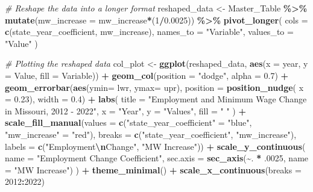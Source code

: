 \documentclass[
]{article}
\newenvironment{Shaded}{\begin{snugshade}}{\end{snugshade}}
\newcommand{\AttributeTok}[1]{\textcolor[rgb]{0.13,0.29,0.53}{#1}}
\newcommand{\CommentTok}[1]{\textcolor[rgb]{0.56,0.35,0.01}{\textit{#1}}}
\newcommand{\DecValTok}[1]{\textcolor[rgb]{0.00,0.00,0.81}{#1}}
\newcommand{\FloatTok}[1]{\textcolor[rgb]{0.00,0.00,0.81}{#1}}
\newcommand{\FunctionTok}[1]{\textcolor[rgb]{0.13,0.29,0.53}{\textbf{#1}}}
\newcommand{\NormalTok}[1]{#1}
\newcommand{\OtherTok}[1]{\textcolor[rgb]{0.56,0.35,0.01}{#1}}
\newcommand{\SpecialCharTok}[1]{\textcolor[rgb]{0.81,0.36,0.00}{\textbf{#1}}}
\newcommand{\StringTok}[1]{\textcolor[rgb]{0.31,0.60,0.02}{#1}}
\begin{document}
\begin{Shaded}
\begin{Highlighting}[]
\CommentTok{\# Reshape the data into a longer format}
\NormalTok{reshaped\_data }\OtherTok{\textless{}{-}}\NormalTok{ Master\_Table }\SpecialCharTok{\%\textgreater{}\%}
  \FunctionTok{mutate}\NormalTok{(}\AttributeTok{mw\_increase =}\NormalTok{ mw\_increase}\SpecialCharTok{*}\NormalTok{(}\DecValTok{1}\SpecialCharTok{/}\FloatTok{0.0025}\NormalTok{)) }\SpecialCharTok{\%\textgreater{}\%}
  \FunctionTok{pivot\_longer}\NormalTok{(}
    \AttributeTok{cols =} \FunctionTok{c}\NormalTok{(state\_year\_coefficient, mw\_increase),}
    \AttributeTok{names\_to =} \StringTok{"Variable"}\NormalTok{,}
    \AttributeTok{values\_to =} \StringTok{"Value"}
\NormalTok{  )}

\CommentTok{\# Plotting the reshaped data}
\NormalTok{col\_plot }\OtherTok{\textless{}{-}} \FunctionTok{ggplot}\NormalTok{(reshaped\_data, }\FunctionTok{aes}\NormalTok{(}\AttributeTok{x =}\NormalTok{ year, }\AttributeTok{y =}\NormalTok{ Value, }\AttributeTok{fill =}\NormalTok{ Variable)) }\SpecialCharTok{+}
  \FunctionTok{geom\_col}\NormalTok{(}\AttributeTok{position =} \StringTok{"dodge"}\NormalTok{, }\AttributeTok{alpha =} \FloatTok{0.7}\NormalTok{) }\SpecialCharTok{+}
  \FunctionTok{geom\_errorbar}\NormalTok{(}\FunctionTok{aes}\NormalTok{(}\AttributeTok{ymin=}\NormalTok{ lwr, }\AttributeTok{ymax=}\NormalTok{ upr), }
                \AttributeTok{position =} \FunctionTok{position\_nudge}\NormalTok{( }\AttributeTok{x =} \FloatTok{0.23}\NormalTok{), }\AttributeTok{width =} \FloatTok{0.4}\NormalTok{) }\SpecialCharTok{+}
  \FunctionTok{labs}\NormalTok{(}
    \AttributeTok{title =} \StringTok{"Employment and Minimum Wage Change in Missouri, 2012 {-} 2022"}\NormalTok{,}
    \AttributeTok{x =} \StringTok{"Year"}\NormalTok{,}
    \AttributeTok{y =} \StringTok{"Values"}\NormalTok{,}
    \AttributeTok{fill =} \StringTok{" "}
\NormalTok{  ) }\SpecialCharTok{+} 
  \FunctionTok{scale\_fill\_manual}\NormalTok{(}\AttributeTok{values =} \FunctionTok{c}\NormalTok{(}\StringTok{"state\_year\_coefficient"} \OtherTok{=} \StringTok{"blue"}\NormalTok{, }\StringTok{"mw\_increase"} \OtherTok{=} \StringTok{"red"}\NormalTok{), }
                    \AttributeTok{breaks =} \FunctionTok{c}\NormalTok{(}\StringTok{"state\_year\_coefficient"}\NormalTok{, }\StringTok{"mw\_increase"}\NormalTok{),}
                    \AttributeTok{labels =} \FunctionTok{c}\NormalTok{(}\StringTok{"Employment}\SpecialCharTok{\textbackslash{}n}\StringTok{Change"}\NormalTok{, }\StringTok{"MW Increase"}\NormalTok{)) }\SpecialCharTok{+}
  \FunctionTok{scale\_y\_continuous}\NormalTok{(}
    \AttributeTok{name =} \StringTok{"Employment Change Coefficient"}\NormalTok{,}
    \AttributeTok{sec.axis =} \FunctionTok{sec\_axis}\NormalTok{(}\SpecialCharTok{\textasciitilde{}}\NormalTok{. }\SpecialCharTok{*}\NormalTok{ .}\DecValTok{0025}\NormalTok{, }\AttributeTok{name =} \StringTok{"MW Increase"}\NormalTok{)}
\NormalTok{  ) }\SpecialCharTok{+} 
  \FunctionTok{theme\_minimal}\NormalTok{() }\SpecialCharTok{+} 
  \FunctionTok{scale\_x\_continuous}\NormalTok{(}\AttributeTok{breaks =} \DecValTok{2012}\SpecialCharTok{:}\DecValTok{2022}\NormalTok{)}
  

\end{Highlighting}
\end{Shaded}
\end{document}
